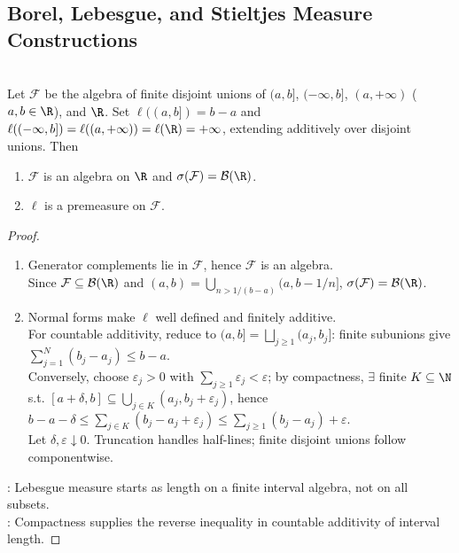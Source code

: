 \subsection{Borel, Lebesgue, and Stieltjes Measure Constructions}

\begin{proposition} \label{prop:half-open-real-line-length-premeasure} \\
Let $\mathcal{F}$ be the algebra of finite disjoint unions of $(a,b]$, $(-\infty,b]$, $(a,+\infty)$ ($a,b\in\R$), and $\R$. Set $\ell((a,b])=b-a$ and $\ell((-\infty,b])=\ell((a,+\infty))=\ell(\R)=+\infty$, extending additively over disjoint unions. Then
\begin{enumerate}[label=(\roman*)]
\setlength{\itemsep}{0pt}
\item $\mathcal{F}$ is an algebra on $\R$ and $\sigma(\mathcal{F})=\mathcal{B}(\R)$.
\item $\ell$ is a premeasure on $\mathcal{F}$.
\end{enumerate}
\begin{proof}
\begin{enumerate}[label=(\roman*)]
\setlength{\itemsep}{0pt}
\item Generator complements lie in $\mathcal{F}$, hence $\mathcal{F}$ is an algebra.\\
Since $\mathcal{F}\subseteq\mathcal{B}(\R)$ and $(a,b)=\bigcup\limits_{n>1/(b-a)}(a,b-1/n]$, $\sigma(\mathcal{F})=\mathcal{B}(\R)$.
\item Normal forms make $\ell$ well defined and finitely additive.\\
For countable additivity, reduce to $(a,b]=\bigsqcup\limits_{j\geq1}(a_j,b_j]$: finite subunions give $\sum\limits_{j=1}^{N}(b_j-a_j)\leq b-a$.\\
Conversely, choose $\varepsilon_j>0$ with $\sum\limits_{j\geq1}\varepsilon_j<\varepsilon$; by compactness, $\exists$ finite $K\subseteq\N$ s.t. $[a+\delta,b]\subseteq\bigcup\limits_{j\in K}(a_j,b_j+\varepsilon_j)$, hence $b-a-\delta\leq\sum\limits_{j\in K}(b_j-a_j+\varepsilon_j)\leq\sum\limits_{j\geq1}(b_j-a_j)+\varepsilon$.\\
Let $\delta,\varepsilon\downarrow0$. Truncation handles half-lines; finite disjoint unions follow componentwise.
\end{enumerate}
: Lebesgue measure starts as length on a finite interval algebra, not on all subsets.\\
: Compactness supplies the reverse inequality in countable additivity of interval length.
\end{proof}
\end{proposition}

